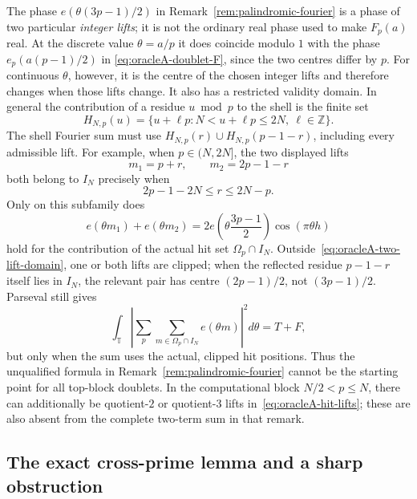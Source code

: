The phase $e(\theta(3p-1)/2)$ in
Remark~\ref{rem:palindromic-fourier} is a phase of two particular
\emph{integer lifts}; it is not the ordinary real phase used to make
$F_p(a)$ real.  At the discrete value $\theta=a/p$ it does coincide
modulo $1$ with the phase $e_p(a(p-1)/2)$ in
\eqref{eq:oracleA-doublet-F}, since the two centres differ by $p$.
For continuous $\theta$, however, it is the centre of the chosen integer
lifts and therefore changes when those lifts change.  It also has a
restricted validity domain.  In general
the contribution of a residue $u\bmod p$ to the shell is the finite set
\begin{equation}
 H_{N,p}(u)=\{u+\ell p:N<u+\ell p\leq2N,\ \ell\in\mathbb Z\}.
 \label{eq:oracleA-hit-lifts}
\end{equation}
The shell Fourier sum must use
$H_{N,p}(r)\cup H_{N,p}(p-1-r)$, including every admissible lift.
For example, when $p\in(N,2N]$, the two displayed lifts
\[
 m_1=p+r,\qquad m_2=2p-1-r
\]
both belong to $I_N$ precisely when
\begin{equation}
 2p-1-2N\leq r\leq2N-p.
 \label{eq:oracleA-two-lift-domain}
\end{equation}
Only on this subfamily does
\[
 e(\theta m_1)+e(\theta m_2)
 =2e\!\left(\theta\frac{3p-1}{2}\right)
       \cos(\pi\theta h)
\]
hold for the contribution of the actual hit set $\Omega_p\cap I_N$.
Outside~\eqref{eq:oracleA-two-lift-domain}, one or both lifts are clipped;
when the reflected residue $p-1-r$ itself lies in $I_N$, the relevant pair
has centre $(2p-1)/2$, not $(3p-1)/2$.  Parseval still gives
\[
 \int_{\mathbb T}\left|\sum_p\sum_{m\in\Omega_p\cap I_N}e(\theta m)
 \right|^2d\theta
 =T+F,
\]
but only when the sum uses the actual, clipped hit positions.  Thus the
unqualified formula in Remark~\ref{rem:palindromic-fourier} cannot be the
starting point for all top-block doublets.  In the computational block
$N/2<p\leq N$, there can additionally be quotient-$2$ or quotient-$3$
lifts in~\eqref{eq:oracleA-hit-lifts}; these are also absent from the
complete two-term sum in that remark.

\subsection{The exact cross-prime lemma and a sharp obstruction}

